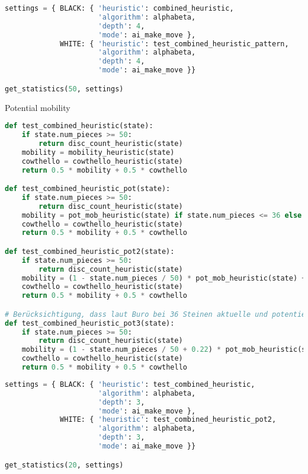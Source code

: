 \begin{lstlisting}[language=Python]
settings = { BLACK: { 'heuristic': combined_heuristic,
                      'algorithm': alphabeta,
                      'depth': 4,
                      'mode': ai_make_move },
             WHITE: { 'heuristic': test_combined_heuristic_pattern,
                      'algorithm': alphabeta,
                      'depth': 4,
                      'mode': ai_make_move }}

get_statistics(50, settings)
\end{lstlisting}

Potential mobility

\begin{lstlisting}[language=Python]
def test_combined_heuristic(state):
    if state.num_pieces >= 50:
        return disc_count_heuristic(state)
    mobility = mobility_heuristic(state)
    cowthello = cowthello_heuristic(state)
    return 0.5 * mobility + 0.5 * cowthello

def test_combined_heuristic_pot(state):
    if state.num_pieces >= 50:
        return disc_count_heuristic(state)
    mobility = pot_mob_heuristic(state) if state.num_pieces <= 36 else mobility_heuristic(state)
    cowthello = cowthello_heuristic(state)
    return 0.5 * mobility + 0.5 * cowthello

def test_combined_heuristic_pot2(state):
    if state.num_pieces >= 50:
        return disc_count_heuristic(state)
    mobility = (1 - state.num_pieces / 50) * pot_mob_heuristic(state) + (state.num_pieces / 50) *  mobility_heuristic(state)
    cowthello = cowthello_heuristic(state)
    return 0.5 * mobility + 0.5 * cowthello

# Berücksichtigung, dass laut Buro bei 36 Steinen aktuelle und potentielle Mobilität gleich gut sind, vorrausgesetzt die Mobilitäten haben die gleiche Größenordnung
def test_combined_heuristic_pot3(state):
    if state.num_pieces >= 50:
        return disc_count_heuristic(state)
    mobility = (1 - state.num_pieces / 50 + 0.22) * pot_mob_heuristic(state) + (state.num_pieces / 50 - 0.22) *  mobility_heuristic(state)
    cowthello = cowthello_heuristic(state)
    return 0.5 * mobility + 0.5 * cowthello
\end{lstlisting}

\begin{lstlisting}[language=Python]
settings = { BLACK: { 'heuristic': test_combined_heuristic,
                      'algorithm': alphabeta,
                      'depth': 3,
                      'mode': ai_make_move },
             WHITE: { 'heuristic': test_combined_heuristic_pot2,
                      'algorithm': alphabeta,
                      'depth': 3,
                      'mode': ai_make_move }}

get_statistics(20, settings)
\end{lstlisting}

